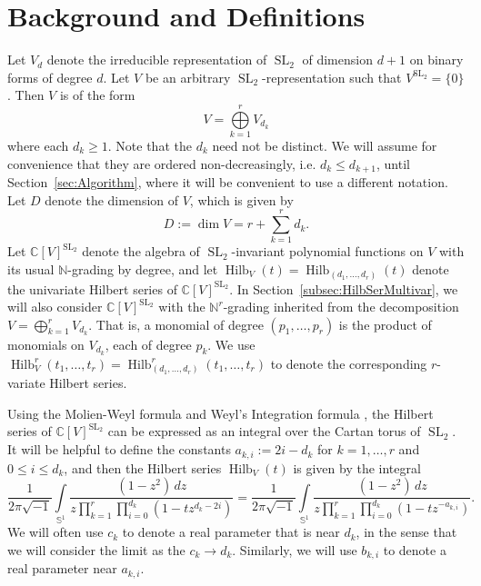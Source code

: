 \documentclass{amsart}
\theoremstyle{definition}
\theoremstyle{remark}
\newcommand{\C}{\mathbb{C}}
\newcommand{\Sp}{\mathbb{S}}
\newcommand{\N}{\mathbb{N}}
\newcommand{\SL}{\operatorname{SL}}
\newcommand{\Hilb}{\operatorname{Hilb}}
\begin{document}

\section{Background and Definitions}
\label{sec:Back}

Let $V_d$ denote the irreducible representation of $\SL_2$ of dimension $d + 1$ on binary forms
of degree $d$. Let $V$ be an arbitrary $\SL_2$-representation such that $V^{\SL_2} = \{0\}$.
Then $V$ is of the form
\[
    V = \bigoplus\limits_{k=1}^r V_{d_k}
\]
where each $d_k \geq 1$. Note that the $d_k$ need not be distinct.
We will assume for convenience that they are ordered non-decreasingly, i.e. $d_k \leq d_{k+1}$,
until Section~\ref{sec:Algorithm}, where it will be convenient to use a different notation.
Let $D$ denote the dimension of $V$, which is given by
\[
    D := \dim V = r + \sum\limits_{k=1}^r d_k.
\]
Let $\C[V]^{\SL_2}$ denote the algebra of $\SL_2$-invariant polynomial functions on $V$ with its usual $\N$-grading
by degree, and let $\Hilb_V(t) = \Hilb_{(d_1,\ldots, d_r)}(t)$ denote the univariate Hilbert series of
$\C[V]^{\SL_2}$. In Section~\ref{subsec:HilbSerMultivar}, we will also consider $\C[V]^{\SL_2}$ with the $\N^r$-grading
inherited from the decomposition $V = \bigoplus_{k=1}^r V_{d_k}$. That is, a monomial of degree
$(p_1,\ldots,p_r)$ is the product of monomials on $V_{d_k}$, each of degree $p_k$. We use
$\Hilb_V^r(t_1,\ldots,t_r) = \Hilb_{(d_1,\ldots, d_r)}^r(t_1,\ldots,t_r)$ to denote the corresponding
$r$-variate Hilbert series.

Using the Molien-Weyl formula \cite[Section 4.6.1]{DerskenKemperBook} and Weyl's Integration formula
\cite[Equation (26.19)]{FultonHarris}, the Hilbert series of $\C[V]^{\operatorname{SL}_2}$ can be expressed
as an integral over the Cartan torus of $\SL_2$. It will be helpful to define the constants $a_{k,i} := 2i - d_k$
for $k=1,\ldots,r$ and $0\leq i\leq d_k$, and then the Hilbert series $\Hilb_V(t)$ is given by the integral
\begin{equation}
\label{eq:MainIntFirst}
    \frac{1}{2\pi\sqrt{-1} }\int\limits_{\Sp^1}
        \frac{ (1 - z^2) \, dz}
        {z \prod\limits_{k=1}^r \prod\limits_{i=0}^{d_k} (1 - t z^{d_k - 2i}) }
        =
    \frac{1}{2\pi\sqrt{-1} }\int\limits_{\Sp^1}
        \frac{ (1 - z^2) \, dz}
        {z \prod\limits_{k=1}^r \prod\limits_{i=0}^{d_k} (1 - t z^{-a_{k,i}}) }.
\end{equation}
We will often use $c_k$ to denote a real parameter that is near $d_k$, in the sense that we will consider
the limit as the $c_k \to d_k$. Similarly, we will use $b_{k,i}$ to denote a real parameter near $a_{k,i}$.
\end{document}
